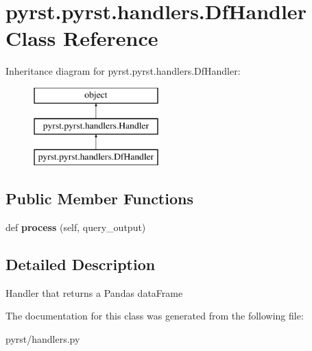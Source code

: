 \hypertarget{classpyrst_1_1pyrst_1_1handlers_1_1_df_handler}{}\section{pyrst.\+pyrst.\+handlers.\+Df\+Handler Class Reference}
\label{classpyrst_1_1pyrst_1_1handlers_1_1_df_handler}
Inheritance diagram for pyrst.\+pyrst.\+handlers.\+Df\+Handler\+:\begin{figure}[H]
\begin{center}
\leavevmode
\includegraphics[height=3.000000cm]{classpyrst_1_1pyrst_1_1handlers_1_1_df_handler}
\end{center}
\end{figure}
\subsection*{Public Member Functions}
\begin{DoxyCompactItemize}
\item 
\hypertarget{classpyrst_1_1pyrst_1_1handlers_1_1_df_handler_a0121c1c288ebc45a0f4c4499c72dd5b4}{}def {\bfseries process} (self, query\+\_\+output)\label{classpyrst_1_1pyrst_1_1handlers_1_1_df_handler_a0121c1c288ebc45a0f4c4499c72dd5b4}

\end{DoxyCompactItemize}


\subsection{Detailed Description}
\begin{DoxyVerb}Handler that returns a Pandas dataFrame
\end{DoxyVerb}
 

The documentation for this class was generated from the following file\+:\begin{DoxyCompactItemize}
\item 
pyrst/handlers.\+py\end{DoxyCompactItemize}
